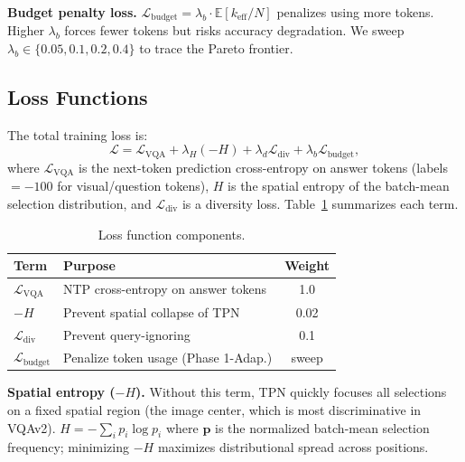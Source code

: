 \documentclass{article}
\begin{document}
\textbf{Budget penalty loss.}
$\mathcal{L}_{\mathrm{budget}} = \lambda_b \cdot \mathbb{E}[k_{\mathrm{eff}} / N]$
penalizes using more tokens.
Higher $\lambda_b$ forces fewer tokens but risks accuracy degradation.
We sweep $\lambda_b \in \{0.05, 0.1, 0.2, 0.4\}$ to trace the Pareto frontier.

\subsection{Loss Functions}
\label{sec:loss}

The total training loss is:
\begin{equation}
  \mathcal{L} = \mathcal{L}_\mathrm{VQA}
              + \lambda_H (-H)
              + \lambda_d \mathcal{L}_\mathrm{div}
              + \lambda_b \mathcal{L}_\mathrm{budget}, \label{eq:loss}
\end{equation}
where $\mathcal{L}_\mathrm{VQA}$ is the next-token prediction cross-entropy on answer
tokens (labels $=-100$ for visual/question tokens), $H$ is the spatial entropy of
the batch-mean selection distribution, and $\mathcal{L}_\mathrm{div}$ is a diversity
loss.
Table~\ref{tab:loss} summarizes each term.

\begin{table}[t]
\caption{Loss function components.}
\label{tab:loss}
\vskip 0.1in
\centering
\begin{small}
\begin{tabular}{llc}
\toprule
\textbf{Term} & \textbf{Purpose} & \textbf{Weight} \\
\midrule
$\mathcal{L}_\mathrm{VQA}$ & NTP cross-entropy on answer tokens & 1.0 \\
$-H$ & Prevent spatial collapse of TPN & 0.02 \\
$\mathcal{L}_\mathrm{div}$ & Prevent query-ignoring & 0.1 \\
$\mathcal{L}_\mathrm{budget}$ & Penalize token usage (Phase 1-Adap.) & sweep \\
\bottomrule
\end{tabular}
\end{small}
\end{table}

\textbf{Spatial entropy ($-H$).}
Without this term, TPN quickly focuses all selections on a fixed spatial region (the image
center, which is most discriminative in VQAv2).
$H = -\sum_i p_i \log p_i$ where $\mathbf{p}$ is the normalized batch-mean selection
frequency; minimizing $-H$ maximizes distributional spread across positions.
\end{document}
